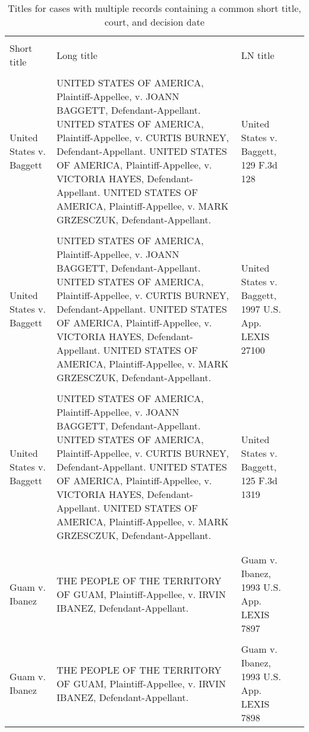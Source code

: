 \documentclass[10pt, letterpaper]{article}
\begin{document}
\begin{spacing}{1.0}
\begin{footnotesize}
\begin{longtable}[H]{>{\raggedright}p{2in}>{\raggedright}p{2in}>{\raggedright}p{2in}p{0in}}
    \caption{Titles for cases with multiple records containing a common short title, court, and decision date}\\
    \hline\\[-6pt]
    Short title & Long title & LN title &\\[2pt]
    \hline\\[-4pt]
    \endhead
        United States v. Baggett & UNITED STATES OF AMERICA, Plaintiff-Appellee, v. JOANN BAGGETT, Defendant-Appellant. UNITED STATES OF AMERICA, Plaintiff-Appellee, v. CURTIS BURNEY, Defendant-Appellant. UNITED STATES OF AMERICA, Plaintiff-Appellee, v. VICTORIA HAYES, Defendant-Appellant. UNITED STATES OF AMERICA, Plaintiff-Appellee, v. MARK GRZESCZUK, Defendant-Appellant. & United States v. Baggett, 129 F.3d 128 &\\
        & & &\\[-4pt]
        United States v. Baggett & UNITED STATES OF AMERICA, Plaintiff-Appellee, v. JOANN BAGGETT, Defendant-Appellant. UNITED STATES OF AMERICA, Plaintiff-Appellee, v. CURTIS BURNEY, Defendant-Appellant. UNITED STATES OF AMERICA, Plaintiff-Appellee, v. VICTORIA HAYES, Defendant-Appellant. UNITED STATES OF AMERICA, Plaintiff-Appellee, v. MARK GRZESCZUK, Defendant-Appellant. & United States v. Baggett, 1997 U.S. App. LEXIS 27100 &\\
        & & &\\[-4pt]
        United States v. Baggett & UNITED STATES OF AMERICA, Plaintiff-Appellee, v. JOANN BAGGETT, Defendant-Appellant. UNITED STATES OF AMERICA, Plaintiff-Appellee, v. CURTIS BURNEY, Defendant-Appellant.  UNITED STATES OF AMERICA, Plaintiff-Appellee, v. VICTORIA HAYES, Defendant-Appellant. UNITED STATES OF AMERICA, Plaintiff-Appellee, v. MARK GRZESCZUK, Defendant-Appellant. & United States v. Baggett, 125 F.3d 1319 &\\
        & & &\\[-4pt]
        \hline\\[-4pt]
        Guam v. Ibanez & THE PEOPLE OF THE TERRITORY OF GUAM, Plaintiff-Appellee, v. IRVIN IBANEZ, Defendant-Appellant. & Guam v. Ibanez, 1993 U.S. App. LEXIS 7897 &\\
        & & &\\[-4pt]
        Guam v. Ibanez & THE PEOPLE OF THE TERRITORY OF GUAM, Plaintiff-Appellee, v. IRVIN IBANEZ, Defendant-Appellant. & Guam v. Ibanez, 1993 U.S. App. LEXIS 7898 &\\

\end{longtable}
\end{footnotesize}
\end{spacing}
\end{document}
